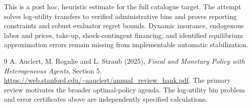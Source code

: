 \documentclass[11pt]{article}
\theoremstyle{definition}
\begin{document}
This is a post hoc, heuristic estimate for the full catalogue target.
The attempt solves log-utility transfers to verified administrative bins and proves reporting constraints and robust evaluator regret bounds. Dynamic insurance, endogenous labor and prices, take-up, shock-contingent financing, and identified equilibrium approximation errors remain missing from implementable automatic stabilization.

\begin{thebibliography}{9}
 A. Auclert, M. Rognlie and L. Straub (2025),
\emph{Fiscal and Monetary Policy with Heterogeneous Agents}, Section 5.
\url{https://web.stanford.edu/~aauclert/annual_review_hank.pdf}.
The primary review motivates the broader optimal-policy agenda. The log-utility
bin problem and error certificates above are independently specified calculations.
\end{thebibliography}
\end{document}
